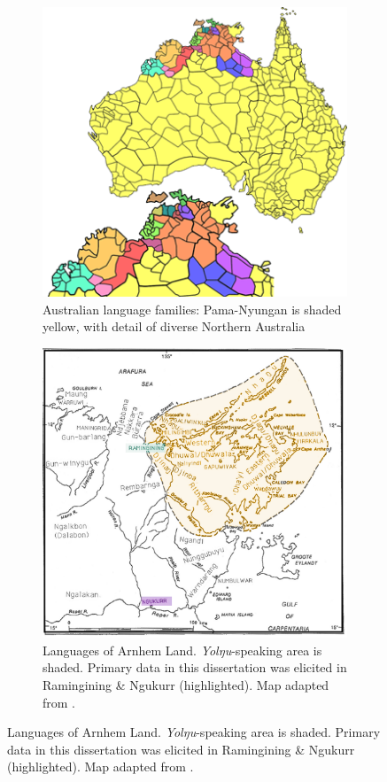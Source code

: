 \documentclass[12pt,dvipsnames]{report}
\begin{document}
\begin{figure}[h]\caption{Map of Australian linguistic areas, including detail of Northern Australia and Arnhem Land}\label{maps}
	\begin{subfigure}[t]{\textwidth}
		\caption{Australian language families: Pama-Nyungan is shaded yellow, with detail of diverse Northern Australia \citep[adapted from][]{Dixon2002a}}\label{pn}\centering
		\includegraphics[width=.6\linewidth]{ALs.png}
	\end{subfigure}
\clearpage
\begin{subfigure}[t]{\textwidth}
	\caption{Languages of Arnhem Land. \textit{Yolŋu}-speaking area is shaded. Primary data in this dissertation was elicited in Ramingining \& Ngukurr (highlighted). Map adapted from \citet[2]{Wilkinson1991}.}\label{arn}\centering
		\includegraphics[width=.85\linewidth]{arnhem-mw2.png}
\end{subfigure}
\end{figure}
\end{document}
